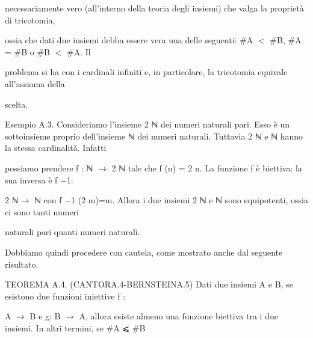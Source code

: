\documentclass[a4paper,portrait,12pt]{article}
\begin{document}
\begin{flushleft}
necessariamente vero (all'interno della teoria degli insiemi) che valga la propriet\`{a} di tricotomia,
\end{flushleft}


\begin{flushleft}
ossia che dati due insiemi debba essere vera una delle seguenti: \#A $<$ \#B, \#A = \#B o \#B $<$ \#A. Il
\end{flushleft}


\begin{flushleft}
problema si ha con i cardinali infiniti e, in particolare, la tricotomia equivale all'assioma della
\end{flushleft}


\begin{flushleft}
scelta.
\end{flushleft}


\begin{flushleft}
Esempio A.3. Consideriamo l'insieme 2 ℕ dei numeri naturali pari. Esso \`{e} un sottoinsieme proprio dell'insieme ℕ dei numeri naturali. Tuttavia 2 ℕ e ℕ hanno la stessa cardinalit\`{a}. Infatti
\end{flushleft}


\begin{flushleft}
possiamo prendere f : ℕ $\rightarrow$ 2 ℕ tale che f (n) = 2 n. La funzione f \`{e} biettiva: la sua inversa \`{e} f $-$1:
\end{flushleft}


\begin{flushleft}
2 ℕ$\rightarrow$ ℕ con f $-$1 (2 m)=m. Allora i due insiemi 2 ℕ e ℕ sono equipotenti, ossia ci sono tanti numeri
\end{flushleft}


\begin{flushleft}
naturali pari quanti numeri naturali.
\end{flushleft}


\begin{flushleft}
Dobbiamo quindi procedere con cautela, come mostrato anche dal seguente risultato.
\end{flushleft}


\begin{flushleft}
TEOREMA A.4. (CANTORA.4-BERNSTEINA.5) Dati due insiemi A e B, se esistono due funzioni iniettive f :
\end{flushleft}


\begin{flushleft}
A $\rightarrow$ B e g: B $\rightarrow$ A, allora esiste almeno una funzione biettiva tra i due insiemi. In altri termini, se \#A ⩽ \#B
\end{flushleft}
\end{document}
